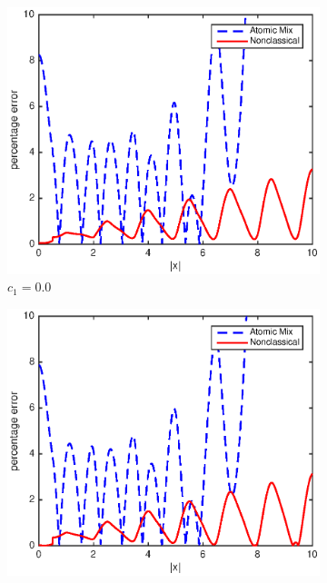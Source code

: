 \documentclass[12pt]{article}
\begin{document}
\begin{figure}[p]
    \centering
    \begin{subfigure}{0.495\textwidth}
        \centering
        \includegraphics[width=\textwidth]{NSE_err_A00.eps}
        \caption{$c_1 = 0.0$}
        \label{fig1a}
    \end{subfigure}
    \hfill
    \begin{subfigure}{0.495\textwidth}
        \centering
        \includegraphics[width=\textwidth]{NSE_err_A10.eps}

\end{subfigure}
\end{figure}
\end{document}

